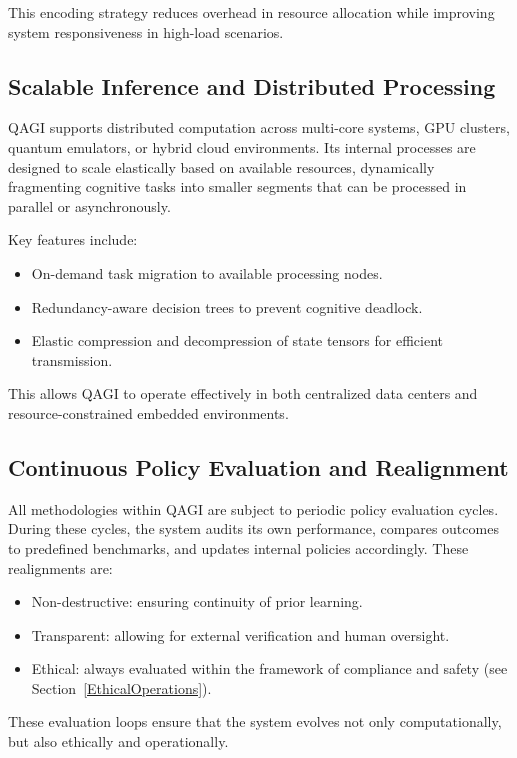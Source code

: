 \documentclass{article}
\theoremstyle{plain}
\theoremstyle{claimstyle}
\begin{document}
This encoding strategy reduces overhead in resource allocation while improving system responsiveness in high-load scenarios.

\subsection{Scalable Inference and Distributed Processing}

QAGI supports distributed computation across multi-core systems, GPU clusters, quantum emulators, or hybrid cloud environments. Its internal processes are designed to scale elastically based on available resources, dynamically fragmenting cognitive tasks into smaller segments that can be processed in parallel or asynchronously.

Key features include:
\begin{itemize}
    \item On-demand task migration to available processing nodes.
    \item Redundancy-aware decision trees to prevent cognitive deadlock.
    \item Elastic compression and decompression of state tensors for efficient transmission.
\end{itemize}

This allows QAGI to operate effectively in both centralized data centers and resource-constrained embedded environments.

\subsection{Continuous Policy Evaluation and Realignment}

All methodologies within QAGI are subject to periodic policy evaluation cycles. During these cycles, the system audits its own performance, compares outcomes to predefined benchmarks, and updates internal policies accordingly. These realignments are:
\begin{itemize}
    \item Non-destructive: ensuring continuity of prior learning.
    \item Transparent: allowing for external verification and human oversight.
    \item Ethical: always evaluated within the framework of compliance and safety (see Section~\ref{EthicalOperations}).
\end{itemize}

These evaluation loops ensure that the system evolves not only computationally, but also ethically and operationally.
\end{document}

